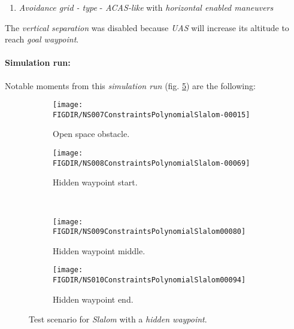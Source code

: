 \begin{enumerate}
    \item \emph{Avoidance grid - type} - \emph{ACAS-like} with  \emph{horizontal enabled maneuvers}
\end{enumerate}

\begin{note}
The \emph{vertical separation} was disabled because \emph{UAS} will  increase its altitude to reach \emph{goal waypoint}.
\end{note}

\paragraph{Simulation run:} Notable moments from this \emph{simulation run} (fig. \ref{fig:testCaseSlalomwithHiddenWaypoint}) are the following:

\begin{figure}[H]
    \centering
    \begin{subfigure}{0.48\textwidth}
    	\centering
        \texttt{[image: \\FIGDIR/NS007ConstraintsPolynomialSlalom-00015]}
        \caption{Open space obstacle.}
        \label{fig:slalomOpenSpaceObstacle}
    \end{subfigure}
    \begin{subfigure}{0.48\textwidth}
    	\centering
        \texttt{[image: \\FIGDIR/NS008ConstraintsPolynomialSlalom-00069]} 
        \caption{Hidden waypoint start.}
        \label{fig:slalomHiddenWaypointStart}
    \end{subfigure}
    \\
    \begin{subfigure}{0.48\textwidth}
	    \centering
        \texttt{[image: \\FIGDIR/NS009ConstraintsPolynomialSlalom00080]} 
        \caption{Hidden waypoint middle.}
        \label{fig:slalomHiddenWaypointMiddle}
    \end{subfigure}
    \begin{subfigure}{0.48\textwidth}
    	\centering
        \texttt{[image: \\FIGDIR/NS010ConstraintsPolynomialSlalom00094]} 
        \caption{Hidden waypoint end.}
        \label{fig:slalomHiddenWaypointEnd}
    \end{subfigure}
    \caption{Test scenario for \emph{Slalom} with a \emph{hidden waypoint}. }
    \label{fig:testCaseSlalomwithHiddenWaypoint}
\end{figure}

